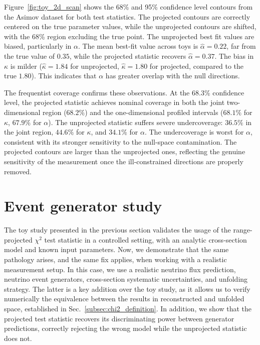 \documentclass[a4paper,11pt]{article}
\begin{document}
Figure~\ref{fig:toy_2d_scan} shows the 68\% and 95\% confidence level contours from the Asimov dataset for both test statistics. The projected contours are correctly centered on the true parameter values, while the unprojected contours are shifted, with the 68\% region excluding the true point. The unprojected best fit values are biased, particularly in $\alpha$. The mean best-fit value across toys is $\hat{\alpha} = 0.22$, far from the true value of $0.35$, while the projected statistic recovers $\hat{\alpha} = 0.37$. The bias in $\kappa$ is milder ($\hat{\kappa} = 1.84$ for unprojected, $\hat{\kappa} = 1.80$ for projected, compared to the true $1.80$). This indicates that $\alpha$ has greater overlap with the null directions.

The frequentist coverage confirms these observations. At the 68.3\% confidence level, the projected statistic achieves nominal coverage in both the joint two-dimensional region ($68.2\%$) and the one-dimensional profiled intervals ($68.1\%$ for $\kappa$, $67.9\%$ for $\alpha$). The unprojected statistic suffers severe undercoverage: $36.5\%$ in the joint region, $44.6\%$ for $\kappa$, and $34.1\%$ for $\alpha$. The undercoverage is worst for $\alpha$, consistent with its stronger sensitivity to the null-space contamination. The projected contours are larger than the unprojected ones, reflecting the genuine sensitivity of the measurement once the ill-constrained directions are properly removed.

\section{Event generator study}
\label{sec:gen}

The toy study presented in the previous section validates the usage of the range-projected $\chi^{2}$ test statistic in a controlled setting, with an analytic cross-section model and known input parameters. Now, we demonstrate that the same pathology arises, and the same fix applies, when working with a realistic measurement setup. In this case, we use a realistic neutrino flux prediction, neutrino event generators, cross-section systematic uncertainties, and unfolding strategy. The latter is a key addition over the toy study, as it allows us to verify numerically the equivalence between the results in reconstructed and unfolded space, established in Sec.~\ref{subsec:chi2_definition}. In addition, we show that the projected test statistic recovers its discriminating power between generator predictions, correctly rejecting the wrong model while the unprojected statistic does not.
\end{document}
